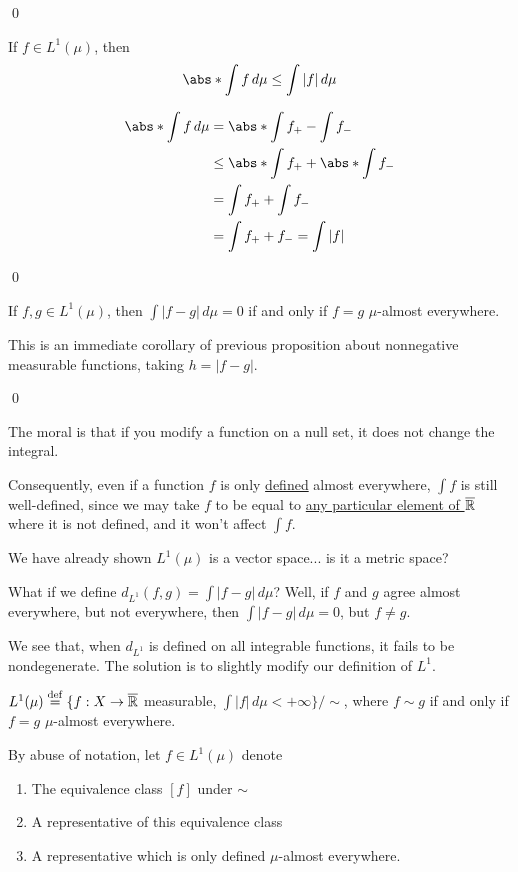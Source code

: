 \documentclass[x11names,reqno,14pt]{extarticle}
\newcommand*{\oo}{\infty}
\newcommand{\barr}{{\bar{\R}}}
\begin{document}
\qed

\prop

If $f \in L^1(\mu)$, then 
\[
\abs*{\int f\,d\mu} \leq \int|f|\,d\mu
\]

\proof
\begin{align*}
\abs*{\int f\,d\mu} & = \abs*{\int f_+ - \int f_- } \\ & \leq \abs*{\int f_+} + \abs*{\int f_-} \\ & = \int f_+ + \int f_- \\ & = \int f_+ + f_- = \int |f| \\
\end{align*}

\qed

\prop

If $f, g \in L^1(\mu)$, then $\int|f - g|\,d\mu = 0$ if and only if $f = g$ $\mu$-almost everywhere. 

\proof 

This is an immediate corollary of previous proposition about nonnegative measurable functions, taking $h = |f - g|$. 

\qed

The moral is that if you modify a function on a null set, it does not change the integral. 

Consequently, even if a function $f$ is only \underline{defined} almost everywhere, $\int f$ is still well-defined, since we may take $f$ to be equal to \underline{any particular element of $\barr$} where it is not defined, and it won't affect $\int f$. 

We have already shown $L^1(\mu)$ is a vector space... is it a metric space?

What if we define $d_{L^1}(f, g) = \int|f - g|\,d\mu$? Well, if $f$ and $g$ agree almost everywhere, but not everywhere, then $\int|f - g|\,d\mu = 0$, but $f\neq g$. 

We see that, when $d_{L^1}$ is defined on all integrable functions, it fails to be nondegenerate. The solution is to slightly modify our definition of $L^1$. 


$L^1(\mu) \eqdef \{f:X\to\barr$ measurable, $\int|f|\,d\mu < +\oo\}/\sim$, where $f \sim g$ if and only if $f = g$ $\mu$-almost everywhere. 

\rem

By abuse of notation, let $f \in L^1(\mu)$ denote
\begin{enumerate}
\item The equivalence class $[f]$ under $\sim$
\item A representative of this equivalence class
\item A representative which is only defined $\mu$-almost everywhere. 
\end{enumerate}
\end{document}
